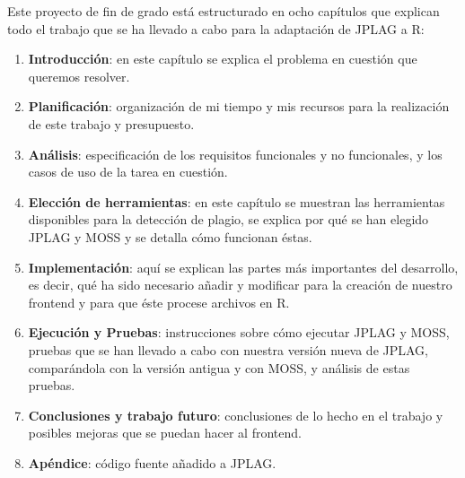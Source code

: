 Este proyecto de fin de grado está estructurado en ocho capítulos que explican todo el trabajo que se ha llevado a cabo para la adaptación de JPLAG a R:
\begin{enumerate}
\item \textbf{Introducción}: en este capítulo se explica el problema en cuestión que queremos resolver.
\item \textbf{Planificación}: organización de mi tiempo y mis recursos para la realización de este trabajo y presupuesto.
\item \textbf{Análisis}: especificación de los requisitos funcionales y no funcionales, y los casos de uso de la tarea en cuestión. 
\item \textbf{Elección de herramientas}: en este capítulo se muestran las herramientas disponibles para la detección de plagio, se explica por qué se han elegido JPLAG y MOSS y se detalla cómo funcionan éstas.
\item \textbf{Implementación}: aquí se explican las partes más importantes del desarrollo, es decir, qué ha sido necesario añadir y modificar para la creación de nuestro frontend y para que éste procese archivos en R.
\item \textbf{Ejecución y Pruebas}: instrucciones sobre cómo ejecutar JPLAG y MOSS, pruebas que se han llevado a cabo con nuestra versión nueva de JPLAG, comparándola con la versión antigua y con MOSS, y análisis de estas pruebas.
\item \textbf{Conclusiones y trabajo futuro}: conclusiones de lo hecho en el trabajo y posibles mejoras que se puedan hacer al frontend.
\item \textbf{Apéndice}: código fuente añadido a JPLAG.
\end{enumerate}
